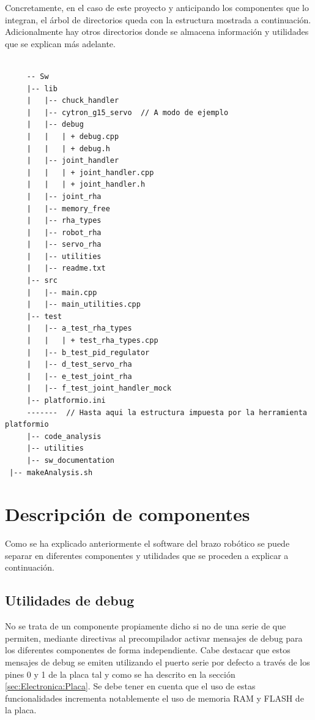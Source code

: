 Concretamente, en el caso de este proyecto y anticipando los componentes que lo integran, el árbol de directorios queda con la  estructura mostrada a continuación. Adicionalmente hay otros directorios donde se almacena información y utilidades que se explican más adelante.

\lstset{language=C, breaklines=true, basicstyle=\footnotesize}
    \begin{lstlisting}[frame=single]

	 -- Sw
	 |-- lib
	 |   |-- chuck_handler
	 |   |-- cytron_g15_servo  // A modo de ejemplo
	 |   |-- debug
	 |   |   | + debug.cpp
	 |   |   | + debug.h
	 |   |-- joint_handler
	 |   |   | + joint_handler.cpp
	 |   |   | + joint_handler.h
	 |   |-- joint_rha
	 |   |-- memory_free
	 |   |-- rha_types
	 |   |-- robot_rha
	 |   |-- servo_rha
	 |   |-- utilities
	 |   |-- readme.txt
	 |-- src
	 |   |-- main.cpp
	 |   |-- main_utilities.cpp
	 |-- test
	 |   |-- a_test_rha_types
	 |   |   | + test_rha_types.cpp
	 |   |-- b_test_pid_regulator
	 |   |-- d_test_servo_rha
	 |   |-- e_test_joint_rha
	 |   |-- f_test_joint_handler_mock
	 |-- platformio.ini
	 -------  // Hasta aqui la estructura impuesta por la herramienta platformio
	 |-- code_analysis
	 |-- utilities
	 |-- sw_documentation
 |-- makeAnalysis.sh
    \end{lstlisting}

\section{Descripción de componentes} \label{sec:SW:descripcion_componentes}

Como se ha explicado anteriormente el software del brazo robótico se puede separar en diferentes componentes y utilidades que se proceden a explicar a continuación.
    \subsection{Utilidades de debug} \label{subsec:SW:debug}
        No se trata de un componente propiamente dicho si no de una serie de  que permiten, mediante directivas al precompilador activar mensajes de debug para los diferentes componentes de forma independiente. Cabe destacar que estos mensajes de debug se emiten utilizando el puerto serie por defecto a través de los pines 0 y 1 de la placa tal y como se ha descrito en la sección \ref{sec:Electronica:Placa}. Se debe tener en cuenta que el uso de estas funcionalidades incrementa notablemente el uso de memoria RAM y FLASH de la placa.
        \\
        
